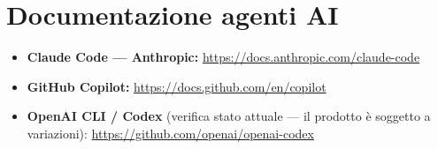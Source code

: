 \section*{Documentazione agenti AI}

\begin{itemize}
  \item \textbf{Claude Code --- Anthropic:} \url{https://docs.anthropic.com/claude-code}
  \item \textbf{GitHub Copilot:} \url{https://docs.github.com/en/copilot}
  \item \textbf{OpenAI CLI / Codex} (verifica stato attuale --- il prodotto è soggetto a variazioni): \url{https://github.com/openai/openai-codex}
\end{itemize}

